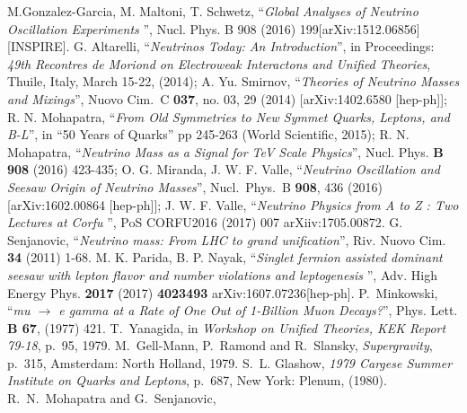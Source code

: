 \documentclass[a4paper,11pt]{article}
\begin{document}
\begin{thebibliography}{99}
 M.Gonzalez-Garcia, M. Maltoni, T. Schwetz, ``{\em Global Analyses of Neutrino Oscillation Experiments }'', Nucl. Phys. B 908 (2016) 199[arXiv:1512.06856][INSPIRE].
  G. Altarelli, ``{\em Neutrinos Today: An
   Introduction}'', in Proceedings: {\em 49th Recontres de Moriond on
 Electroweak Interactons and Unified Theories}, Thuile, Italy, March
 15-22, (2014);
 A. Yu. Smirnov, ``{\em Theories of Neutrino Masses and Mixings}'',
Nuovo Cim.\ C {\bf 037}, no. 03, 29 (2014)
  [arXiv:1402.6580 [hep-ph]];
R. N. Mohapatra, ``{\em From Old Symmetries to New Symmet%
    Quarks, Leptons, and B-L}'', in ``50 Years of Quarks'' pp 245-263
  (World Scientific, 2015);
R. N. Mohapatra, ``{\em Neutrino Mass as a
   Signal for TeV Scale Physics}'',  Nucl. Phys. {\bf B 908} (2016)
  423-435;
O. G. Miranda, J. W. F. Valle, ``{\em Neutrino Oscillation and
   Seesaw Origin of Neutrino Masses}'',
Nucl.\ Phys.\ B {\bf 908}, 436 (2016)
  [arXiv:1602.00864 [hep-ph]];  
 J. W. F. Valle, ``{\em Neutrino Physics from A to Z : Two Lectures at Corfu  }'', PoS CORFU2016 (2017) 007 arXiiv:1705.00872.    
 G. Senjanovic, ``{\em Neutrino mass: From LHC to
  grand unification}'', Riv. Nuovo Cim. {\bf 34}
  (2011) 1-68. 
 M. K. Parida, B. P. Nayak, ``{\em Singlet
  fermion assisted dominant seesaw with lepton flavor and number
  violations and leptogenesis }'', Adv. High Energy Phys. {\bf 2017}
  (2017) {\bf 4023493} arXiv:1607.07236[hep-ph].
 P.~Minkowski,
 ``{\em {mu $\to$ e gamma at a Rate of One Out of 1-Billion Muon  Decays?}}'',
 Phys. Lett. {\bf B 67}, (1977)  421.
T.~Yanagida, in {\em Workshop on Unified Theories, KEK Report
79-18}, p.~95, 1979.
M.~Gell-Mann, P.~Ramond and R.~Slansky, {\em Supergravity},
p.~315,
\newblock Amsterdam: North Holland, 1979.
S.~L. Glashow, {\em 1979 Cargese Summer Institute on Quarks and
Leptons},
 p.~687,
\newblock New York: Plenum, (1980).
 R.~N.~Mohapatra and G.~Senjanovic,

\end{thebibliography}
\end{document}
